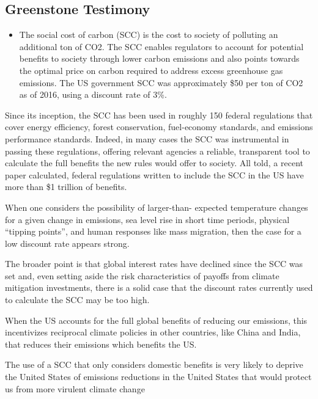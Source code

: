 \documentclass[
]{book}
\providecommand{\tightlist}{%
  \setlength{\itemsep}{0pt}\setlength{\parskip}{0pt}}
\begin{document}
\hypertarget{greenstone-testimony}{%
\subsection{Greenstone Testimony}\label{greenstone-testimony}}

\begin{itemize}
\tightlist
\item
  The social cost of carbon (SCC) is the cost to society of polluting an additional ton of CO2.
  The SCC enables regulators to account for potential benefits to society through lower carbon
  emissions and also points towards the optimal price on carbon required to address excess
  greenhouse gas emissions. The US government SCC was approximately \$50 per ton of CO2
  as of 2016, using a discount rate of 3\%.
\end{itemize}

Since its inception, the SCC has been used in roughly 150 federal regulations that cover energy
efficiency, forest conservation, fuel-economy standards, and emissions performance standards.
Indeed, in many cases the SCC was instrumental in passing these regulations, offering relevant
agencies a reliable, transparent tool to calculate the full benefits the new rules would offer to
society. All told, a recent paper calculated, federal regulations written to include the SCC in the
US have more than \$1 trillion of benefits.

When one considers the possibility of larger-than-
expected temperature changes for a given change in emissions, sea level rise in short time
periods, physical ``tipping points'', and human responses like mass migration, then the case for a
low discount rate appears strong.

The broader point is that global
interest rates have declined since the SCC was set and, even setting aside the risk characteristics
of payoffs from climate mitigation investments, there is a solid case that the discount rates
currently used to calculate the SCC may be too high.

When the US accounts for the full global benefits of reducing
our emissions, this incentivizes reciprocal climate policies in other countries, like China and
India, that reduces their emissions which benefits the US.

The use of a SCC that only
considers domestic benefits is very likely to deprive the United States of emissions reductions in
the United States that would protect us from more virulent climate change
\end{document}
